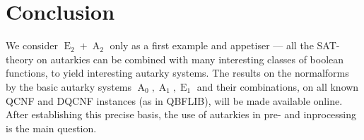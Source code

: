 \documentclass[conference]{IEEEtran}
\DeclareMathOperator{\Aaut}{A}
\DeclareMathOperator{\Eaut}{E}
\begin{document}
\section{Conclusion}
\label{sec:conc}

We consider $\Eaut_2 + \Aaut_2$ only as a first example and appetiser --- all the SAT-theory on autarkies can be combined with many interesting classes of boolean functions, to yield interesting autarky systems.
The results on the normalforms by the basic autarky systems $\Aaut_0, \Aaut_1, \Eaut_1$ and their combinations, on all known QCNF and DQCNF instances (as in QBFLIB), will be made available online.
After establishing this precise basis, the use of autarkies in pre- and inprocessing is the main question.


%
%


\end{document}
